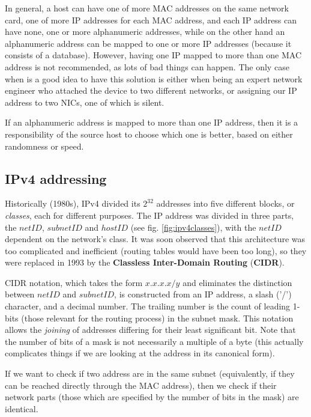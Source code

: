 \vspace{0.5em}

In general, a host can have one of more MAC addresses on the same network card, one of more IP addresses for each MAC address, and each IP address can have none, one or more alphanumeric addresses, while on the other hand an alphanumeric address can be mapped to one or more IP addresses (because it consists of a database). However, having one IP mapped to more than one MAC address is not recommended, as lots of bad things can happen. The only case when is a good idea to have this solution is either when being an expert network engineer who attached the device to two different networks, or assigning our IP address to two NICs, one of which is silent.

If an alphanumeric address is mapped to more than one IP address, then it is a responsibility of the source host to choose which one is better, based on either randomness or speed.


\subsection{IPv4 addressing}
Historically (1980s), IPv4 divided its $2^{32}$ addresses into five different blocks, or \textit{classes}, each for different purposes. The IP address was divided in three parts, the $netID$, $subnetID$ and $hostID$ (see fig. \ref{fig:ipv4classes}), with the $netID$ dependent on the network's class. It was soon observed that this architecture was too complicated and inefficient (routing tables would have been too long), so they were replaced in 1993 by the \textbf{Classless Inter-Domain Routing} (\textbf{CIDR}).

CIDR notation, which takes the form $x.x.x.x/y$ and eliminates the distinction between $netID$ and $subnetID$, is constructed from an IP address, a slash ('/') character, and a decimal number. The trailing number is the count of leading 1-bits (those relevant for the routing process) in the subnet mask. This notation allows the \textit{joining} of addresses differing for their least significant bit. Note that the number of bits of a mask is not necessarily a multiple of a byte (this actually complicates things if we are looking at the address in its canonical form).

If we want to check if two address are in the same subnet (equivalently, if they can be reached directly through the MAC address), then we check if their network parts (those which are specified by the number of bits in the mask) are identical.

